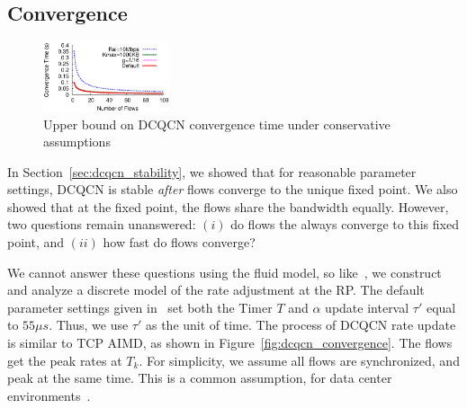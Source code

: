 \vspace{-0.1em}
\subsection{Convergence}
\label{sec:dcqcn_convergence}


\begin{figure}[t]
\centering
\includegraphics[width=0.33\textwidth]{figures/dcqcn_convergence_time.eps}
\vspace{-1em}
\caption{Upper bound on DCQCN convergence time under conservative assumptions}
\vspace{-1em}
\label{fig:dcqcn_convergence_time}
\end{figure}
\fi

In Section~\ref{sec:dcqcn_stability}, we showed that for reasonable parameter
settings,  DCQCN is stable {\em after} flows converge to the unique fixed point.
We also showed that at the fixed point, the flows share the bandwidth equally.
However, two questions remain unanswered: $(i)$ do flows the always converge
to this fixed point, and $(ii)$ how fast do flows converge? 

We cannot answer these questions using the fluid model, so
like~\cite{dctcp-analysis}, we construct and analyze a discrete model of the
rate adjustment at the RP. The default parameter settings given in~\cite{dcqcn}
set both the Timer $T$ and $\alpha$ update interval $\tau '$ equal to $55\mu s$.
Thus, we use $\tau '$ as the unit of time.  The process of DCQCN rate update is
similar to TCP AIMD, as shown in Figure~\ref{fig:dcqcn_convergence}.  The flows
get the peak rates at $T_k$. For simplicity, we assume all flows are
synchronized, and peak at the same time.  This is a common assumption, for data
center environments~\cite{dctcp-analysis}.

